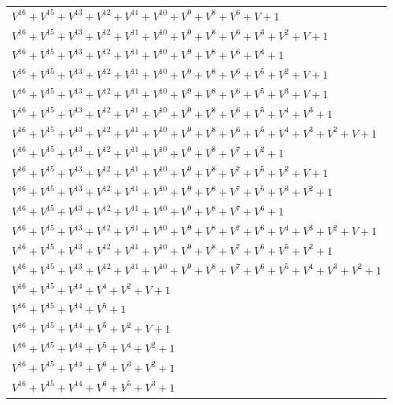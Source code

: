 \documentclass[12pt]{article}
\begin{document}
\begin{adjustwidth}{-4cm}{}
\begin{center}
\begin{longtable}{|l|}
$V^{16}  +V^{15}  +V^{13}  +V^{12}  +V^{11}  +V^{10}  +V^{9}  +V^{8}  +V^{6}  + V + 1$ \\
$V^{16}  +V^{15}  +V^{13}  +V^{12}  +V^{11}  +V^{10}  +V^{9}  +V^{8}  +V^{6}  +V^{3}  +V^{2}  + V + 1$ \\
$V^{16}  +V^{15}  +V^{13}  +V^{12}  +V^{11}  +V^{10}  +V^{9}  +V^{8}  +V^{6}  +V^{4}  + 1$ \\
$V^{16}  +V^{15}  +V^{13}  +V^{12}  +V^{11}  +V^{10}  +V^{9}  +V^{8}  +V^{6}  +V^{5}  +V^{2}  + V + 1$ \\
$V^{16}  +V^{15}  +V^{13}  +V^{12}  +V^{11}  +V^{10}  +V^{9}  +V^{8}  +V^{6}  +V^{5}  +V^{3}  + V + 1$ \\
$V^{16}  +V^{15}  +V^{13}  +V^{12}  +V^{11}  +V^{10}  +V^{9}  +V^{8}  +V^{6}  +V^{5}  +V^{4}  +V^{3}  + 1$ \\
$V^{16}  +V^{15}  +V^{13}  +V^{12}  +V^{11}  +V^{10}  +V^{9}  +V^{8}  +V^{6}  +V^{5}  +V^{4}  +V^{3}  +V^{2}  + V + 1$ \\
$V^{16}  +V^{15}  +V^{13}  +V^{12}  +V^{11}  +V^{10}  +V^{9}  +V^{8}  +V^{7}  +V^{2}  + 1$ \\
$V^{16}  +V^{15}  +V^{13}  +V^{12}  +V^{11}  +V^{10}  +V^{9}  +V^{8}  +V^{7}  +V^{5}  +V^{2}  + V + 1$ \\
$V^{16}  +V^{15}  +V^{13}  +V^{12}  +V^{11}  +V^{10}  +V^{9}  +V^{8}  +V^{7}  +V^{5}  +V^{3}  +V^{2}  + 1$ \\
$V^{16}  +V^{15}  +V^{13}  +V^{12}  +V^{11}  +V^{10}  +V^{9}  +V^{8}  +V^{7}  +V^{6}  + 1$ \\
$V^{16}  +V^{15}  +V^{13}  +V^{12}  +V^{11}  +V^{10}  +V^{9}  +V^{8}  +V^{7}  +V^{6}  +V^{4}  +V^{3}  +V^{2}  + V + 1$ \\
$V^{16}  +V^{15}  +V^{13}  +V^{12}  +V^{11}  +V^{10}  +V^{9}  +V^{8}  +V^{7}  +V^{6}  +V^{5}  +V^{2}  + 1$ \\
$V^{16}  +V^{15}  +V^{13}  +V^{12}  +V^{11}  +V^{10}  +V^{9}  +V^{8}  +V^{7}  +V^{6}  +V^{5}  +V^{4}  +V^{3}  +V^{2}  + 1$ \\
$V^{16}  +V^{15}  +V^{14}  +V^{4}  +V^{2}  + V + 1$ \\
$V^{16}  +V^{15}  +V^{14}  +V^{5}  + 1$ \\
$V^{16}  +V^{15}  +V^{14}  +V^{5}  +V^{2}  + V + 1$ \\
$V^{16}  +V^{15}  +V^{14}  +V^{5}  +V^{4}  +V^{2}  + 1$ \\
$V^{16}  +V^{15}  +V^{14}  +V^{6}  +V^{3}  +V^{2}  + 1$ \\
$V^{16}  +V^{15}  +V^{14}  +V^{6}  +V^{5}  +V^{3}  + 1$ \\

\end{longtable}
\end{center}
\end{adjustwidth}
\end{document}
